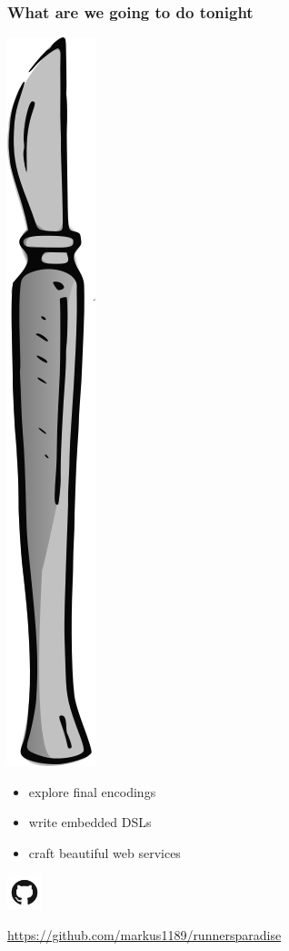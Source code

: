 \documentclass{beamer}
\begin{document}
\begin{frame}
  \frametitle{What are we going to do tonight}
  \begin{minipage}{0.2\linewidth}
    \includegraphics[width=0.19\linewidth]{../pics/scalpel.png}
  \end{minipage}
  \begin{minipage}{0.7\linewidth}
    \begin{itemize}
    \item explore final encodings
    \item write embedded DSLs
    \item craft beautiful web services
    \end{itemize}
  \end{minipage}
  \vfill
  \begin{center}
    \includegraphics[height=10mm]{../pics/github.png}
  \end{center}
  \begin{center}
    \url{https://github.com/markus1189/runnersparadise}
  \end{center}
\end{frame}
\end{document}
